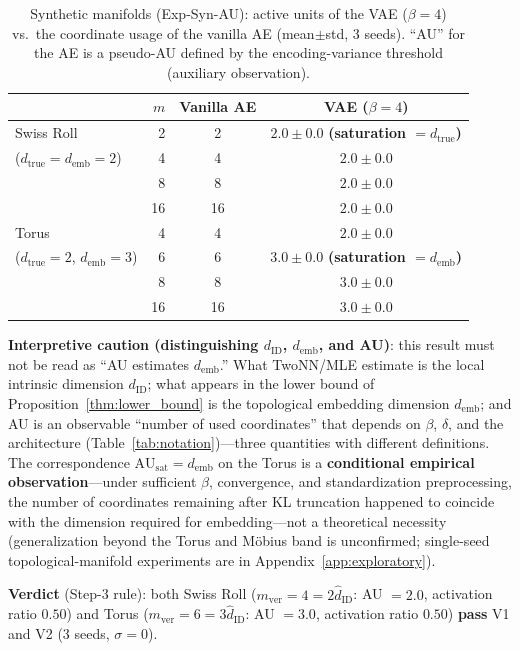 \documentclass[make,article,submit,pdftex,moreauthors]{Definitions/mdpi}
\newcommand{\dID}{d_{\mathrm{ID}}}
\newcommand{\hatdID}{\hat{d}_{\mathrm{ID}}}
\newcommand{\dtrue}{d_{\mathrm{true}}}
\newcommand{\AUsat}{\mathrm{AU}_{\mathrm{sat}}}
\newcommand{\demb}{d_{\mathrm{emb}}}
\begin{document}
\begin{table}[H]
\caption{Synthetic manifolds (Exp-Syn-AU): active units of the VAE
($\beta = 4$) vs.\ the coordinate usage of the vanilla AE (mean$\pm$std,
3 seeds). ``AU'' for the AE is a pseudo-AU defined by the encoding-variance
threshold (auxiliary observation).}
\label{tab:ea}
\small
\begin{tabular}{lrcc}
\toprule
 & $m$ & \textbf{Vanilla AE} & \textbf{VAE ($\beta = 4$)} \\
\midrule
Swiss Roll & 2 & 2 & $2.0 \pm 0.0$ \textbf{(saturation $= \dtrue$)} \\
($\dtrue = \demb = 2$) & 4 & 4 & $2.0 \pm 0.0$ \\
 & 8 & 8 & $2.0 \pm 0.0$ \\
 & 16 & 16 & $2.0 \pm 0.0$ \\
\midrule
Torus & 4 & 4 & $2.0 \pm 0.0$ \\
($\dtrue = 2$, $\demb = 3$) & 6 & 6 & $3.0 \pm 0.0$ \textbf{(saturation $= \demb$)} \\
 & 8 & 8 & $3.0 \pm 0.0$ \\
 & 16 & 16 & $3.0 \pm 0.0$ \\
\bottomrule
\end{tabular}
\end{table}

\textbf{Interpretive caution (distinguishing $\dID$, $\demb$, and AU)}:
this result must not be read as ``AU estimates $\demb$.''
What TwoNN/MLE estimate is the local intrinsic dimension $\dID$; what
appears in the lower bound of Proposition~\ref{thm:lower_bound} is the
topological embedding dimension $\demb$; and AU is an observable ``number of
used coordinates'' that depends on $\beta$, $\delta$, and the architecture
(Table~\ref{tab:notation})---three quantities with different definitions.
The correspondence $\AUsat = \demb$ on the Torus is a \textbf{conditional
empirical observation}---under sufficient $\beta$, convergence, and
standardization preprocessing, the number of coordinates remaining after KL
truncation happened to coincide with the dimension required for
embedding---not a theoretical necessity
(generalization beyond the Torus and M\"obius band is unconfirmed;
single-seed topological-manifold experiments are in
Appendix~\ref{app:exploratory}).

\textbf{Verdict} (Step-3 rule): both Swiss Roll
($m_{\mathrm{ver}} = 4 = 2\hatdID$: AU $= 2.0$, activation ratio $0.50$) and
Torus ($m_{\mathrm{ver}} = 6 = 3\hatdID$: AU $= 3.0$, activation ratio
$0.50$) \textbf{pass} V1 and V2 (3 seeds, $\sigma = 0$).
\end{document}
